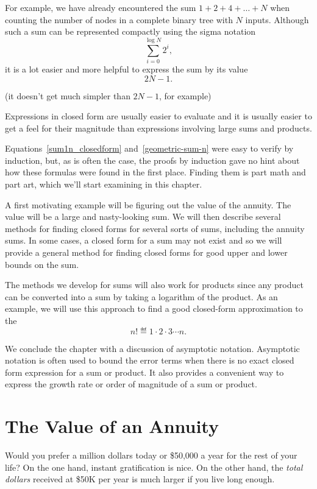 For example, we have already encountered the sum $1 + 2 + 4 + \dots +
N$ when counting the number of nodes in a complete binary tree with
$N$ inputs.  Although such a sum can be represented compactly using
the sigma notation
\begin{equation}
    \sum_{i = 0}^{\log N} 2^i,
\end{equation}
it is a lot easier and more helpful to express the sum by
its  value
\[
    2 N - 1.
\]

(it doesn't get much simpler than $2 N - 1$, for example) 

Expressions in closed form are usually easier to evaluate and it is
usually easier to get a feel for their magnitude than expressions
involving large sums and products.\fi

Equations~\eqref{sum1n_closedform} and~\eqref{geometric-sum-n} were
easy to verify by induction, but, as is often the case, the proofs by
induction gave no hint about how these formulas were found in the
first place.  Finding them is part math and part art, which we'll
start examining in this chapter.

A first motivating example will be figuring out the value of the
annuity.  The value will be a large and nasty-looking sum.  We will
then describe several methods for finding closed forms for several
sorts of sums, including the annuity sums.  In some cases, a closed
form for a sum may not exist and so we will provide a general method
for finding closed forms for good upper and lower bounds on the
sum.

The methods we develop for sums will also work for products since any
product can be converted into a sum by taking a logarithm of the
product.  As an example, we will use this approach to find a good
closed-form approximation to the 
\[
    n! \eqdef 1 \cdot 2 \cdot 3 \cdots n.
\]

We conclude the chapter with a discussion of asymptotic notation.
Asymptotic notation is often used to bound the error terms when there
is no exact closed form expression for a sum or product.  It also
provides a convenient way to express the growth rate or order of
magnitude of a sum or product.

\section{The Value of an Annuity}\label{annuity_sec}

Would you prefer a million dollars today or \$50,000 a year for the
rest of your life?  On the one hand, instant gratification is nice.
On the other hand, the \emph{total dollars} received at \$50K per year
is much larger if you live long enough.

